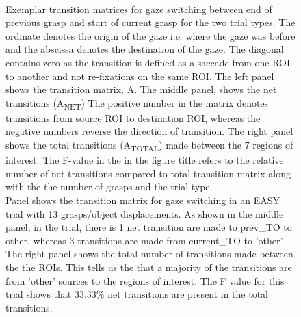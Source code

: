 \begin{figure}[h]
    \centering
     \\
    \caption[]{Exemplar transition matrices for gaze switching between end of previous grasp and start of current grasp for the two trial types. The ordinate denotes the origin of the gaze i.e. where the gaze was before and the abscissa denotes the destination of the gaze. The diagonal contains zero as the transition is defined as a saccade from one ROI to another and not re-fixations on the same ROI. The left panel shows the transition matrix, A. The middle panel, shows the net transitions (A\textsubscript{NET}) The positive number in the matrix denotes transitions from source ROI to destination ROI, whereas the negative numbers reverse the direction of transition. The right panel shows the total transitions (A\textsubscript{TOTAL})  made between the 7 regions of interest. The F-value in the in the figure title refers to the relative number of net transitions compared to total transition matrix along with the the number of grasps and the trial type.  \\
    Panel \protect{} shows the transition matrix for gaze switching in an EASY trial with 13 grasps/object displacements. As shown in the middle panel, in the trial, there is 1 net transition are made to prev\_TO to other, whereas 3 transitions are made from current\_TO to 'other'. The right panel shows the total number of transitions made between the the ROIs. This tells us the that a majority of the transitions are from 'other' sources to the regions of interest. The F value for this trial shows that 33.33\%  net transitions are present in the total transitions.\\
}
\end{figure}
